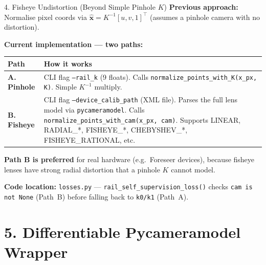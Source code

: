 \documentclass[aspectratio=169, 12pt]{beamer}
\begin{document}
\begin{frame}{4. Fisheye Undistortion (Beyond Simple Pinhole $K$)}
\small
\textbf{Previous approach:} Normalise pixel coords via $\hat{\mathbf{x}} = K^{-1}[u,v,1]^\top$
(assumes a pinhole camera with no distortion).

\medskip
\textbf{Current implementation --- two paths:}

\medskip
\begin{tabular}{lp{8cm}}
\toprule
\textbf{Path} & \textbf{How it works} \\
\midrule
\textbf{A. Pinhole} &
  CLI flag \texttt{--rail\_k} (9 floats). Calls
  \texttt{normalize\_points\_with\_K(x\_px, K)}.
  Simple $K^{-1}$ multiply. \\
\textbf{B. Fisheye} &
  CLI flag \texttt{--device\_calib\_path} (XML file).
  Parses the full lens model via \texttt{pycameramodel}.
  Calls \texttt{normalize\_points\_with\_cam(x\_px, cam)}.
  Supports LINEAR, RADIAL\_*, FISHEYE\_*, CHEBYSHEV\_*, FISHEYE\_RATIONAL, etc. \\
\bottomrule
\end{tabular}

\medskip
\textbf{Path B is preferred} for real hardware (e.g.\ Foreseer devices), because
fisheye lenses have strong radial distortion that a pinhole $K$ cannot model.

\medskip
\textbf{Code location:} \texttt{losses.py} --- \texttt{rail\_self\_supervision\_loss()}
checks \texttt{cam is not None} (Path~B) before falling back to \texttt{k0/k1} (Path~A).
\end{frame}


\section{5. Differentiable Pycameramodel Wrapper}
\end{document}
